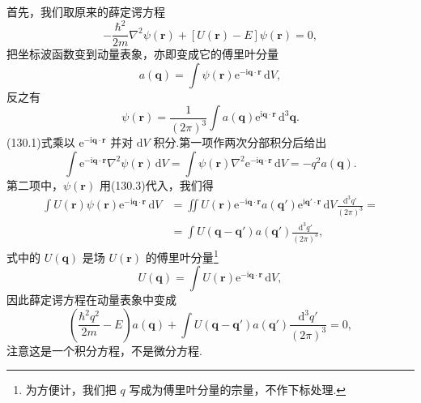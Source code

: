 首先，我们取原来的薛定谔方程
\begin{equation}
  -\frac{\hbar^2}{2m}\nabla^2\psi(\boldsymbol{r})
  +\left[U(\boldsymbol{r})-E\right]\psi(\boldsymbol{r})=0,
\end{equation}
把坐标波函数变到动量表象，亦即变成它的傅里叶分量
\begin{equation}
  a(\boldsymbol{q})=\int\psi(\boldsymbol{r})
  \mathrm{e}^{-\mathrm{i}\boldsymbol{q}\cdot\boldsymbol{r}}\,\mathrm{d}V,
\end{equation}
反之有
\begin{equation}
  \psi(\boldsymbol{r})=\frac{1}{(2\pi)^3}\int a(\boldsymbol{q})
  \mathrm{e}^{\mathrm{i}\boldsymbol{q}\cdot\boldsymbol{r}}\,\mathrm{d}^3\boldsymbol{q}.
\end{equation}
(130.1)式乘以 $\mathrm{e}^{-\mathrm{i}\boldsymbol{q}\cdot\boldsymbol{r}}$ 并对 $\mathrm{d}V$ 积分.第一项作两次分部积分后给出
\begin{equation*}
  \int\mathrm{e}^{-\mathrm{i}\boldsymbol{q}\cdot\boldsymbol{r}}
  \nabla^2\psi(\boldsymbol{r})\,\mathrm{d}V
  =\int\psi(\boldsymbol{r})
  \nabla^2\mathrm{e}^{-\mathrm{i}\boldsymbol{q}\cdot\boldsymbol{r}}\,\mathrm{d}V
  =-q^2a(\boldsymbol{q}).
\end{equation*}
第二项中，$\psi(\boldsymbol{r})$ 用(130.3)代入，我们得
\begin{equation*}
\begin{aligned}
  \int U(\boldsymbol{r})\psi(\boldsymbol{r})
  \mathrm{e}^{-\mathrm{i}\boldsymbol{q}\cdot\boldsymbol{r}}\,\mathrm{d}V
  &=\iint U(\boldsymbol{r})\mathrm{e}^{-\mathrm{i}\boldsymbol{q}\cdot\boldsymbol{r}}
  a(\boldsymbol{q}')\mathrm{e}^{\mathrm{i}\boldsymbol{q}'\cdot\boldsymbol{r}}\,
  \mathrm{d}V\frac{\mathrm{d}^3q'}{(2\pi)^3}=\\
  &=\int U(\boldsymbol{q}-\boldsymbol{q}')a(\boldsymbol{q}')
  \frac{\mathrm{d}^3q'}{(2\pi)^3},
\end{aligned}
\end{equation*}
式中的 $U(\boldsymbol{q})$ 是场 $U(\boldsymbol{r})$ 的傅里叶分量\footnote{为方便计，我们把 $q$ 写成为傅里叶分量的宗量，不作下标处理.}
\begin{equation*}
  U(\boldsymbol{q})=\int U(\boldsymbol{r})
  \mathrm{e}^{-\mathrm{i}\boldsymbol{q}\cdot\boldsymbol{r}}\,\mathrm{d}V,
\end{equation*}
因此薛定谔方程在动量表象中变成
\begin{equation}
  \left(\frac{\hbar^2q^2}{2m}-E\right)a(\boldsymbol{q})
  +\int U(\boldsymbol{q}-\boldsymbol{q}')a(\boldsymbol{q}')
  \frac{\mathrm{d}^3q'}{(2\pi)^3}=0,
\end{equation}
注意这是一个积分方程，不是微分方程.

